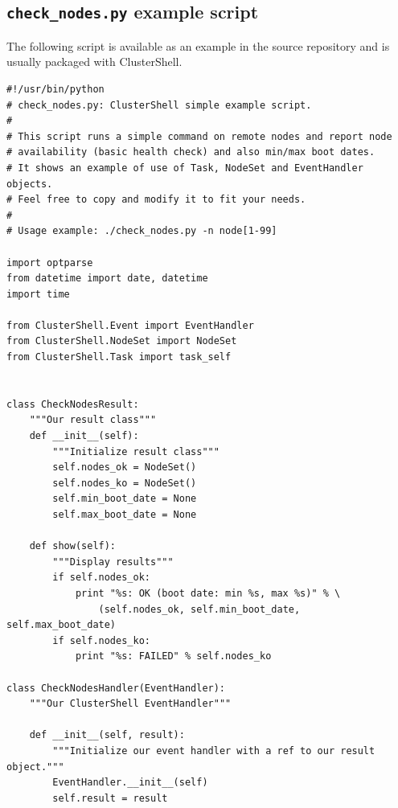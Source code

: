 \documentclass[english,a4paper]{csuserguide}
\begin{document}
\subsection{\texttt{check\_nodes.py} example script}

The following script is available as an example in the source repository and is usually packaged with ClusterShell.
\medskip
\begin{lstlisting}[breaklines=true, breakatwhitespace=true]
#!/usr/bin/python
# check_nodes.py: ClusterShell simple example script.
#
# This script runs a simple command on remote nodes and report node
# availability (basic health check) and also min/max boot dates.
# It shows an example of use of Task, NodeSet and EventHandler objects.
# Feel free to copy and modify it to fit your needs.
#
# Usage example: ./check_nodes.py -n node[1-99]

import optparse
from datetime import date, datetime
import time

from ClusterShell.Event import EventHandler
from ClusterShell.NodeSet import NodeSet
from ClusterShell.Task import task_self


class CheckNodesResult:
    """Our result class"""
    def __init__(self):
        """Initialize result class"""
        self.nodes_ok = NodeSet()
        self.nodes_ko = NodeSet()
        self.min_boot_date = None
        self.max_boot_date = None

    def show(self):
        """Display results"""
        if self.nodes_ok:
            print "%s: OK (boot date: min %s, max %s)" % \
                (self.nodes_ok, self.min_boot_date, self.max_boot_date)
        if self.nodes_ko:
            print "%s: FAILED" % self.nodes_ko

class CheckNodesHandler(EventHandler):
    """Our ClusterShell EventHandler"""
    
    def __init__(self, result):
        """Initialize our event handler with a ref to our result object."""
        EventHandler.__init__(self)
        self.result = result


\end{lstlisting}
\end{document}
